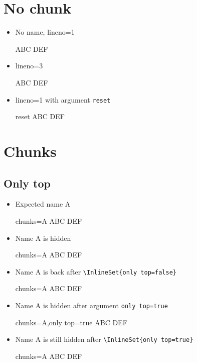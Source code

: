 \documentclass{article}
\begin{document}
\section{No chunk}
\begin{itemize}
\item No name, lineno=1
\begin{Inline}{}
ABC
DEF
\end{Inline}
\item
lineno=3
\begin{Inline}{}
ABC
DEF
\end{Inline}
\item
lineno=1 with argument \texttt{reset}
\begin{Inline}{reset}
ABC
DEF
\end{Inline}
\end{itemize}
\section{Chunks}
\subsection{Only top}
\begin{itemize}
\item  Expected name A
\begin{Inline}{chunks=A}
ABC
DEF
\end{Inline}
\item Name A is hidden
\begin{Inline}{chunks=A}
ABC
DEF
\end{Inline}
\item Name A is back after \verb|\InlineSet{only top=false}|
\begin{Inline}{chunks=A}
ABC
DEF
\end{Inline}
\item Name A is hidden after argument \verb|only top=true|
\begin{Inline}{chunks=A,only top=true}
ABC
DEF
\end{Inline}
\item Name A is still hidden after \verb|\InlineSet{only top=true}|
\begin{Inline}{chunks=A}
ABC
DEF
\end{Inline}
\end{itemize}
\end{document}
